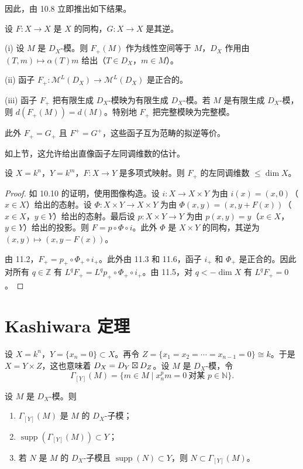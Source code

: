 因此，由 10.8 立即推出如下结果。

\begin{lemma}
设 $F:X\to X$ 是 $X$ 的同构，$G:X\to X$ 是其逆。

(i) 设 $M$ 是 $D_X$-模。则 $F_+(M)$ 作为线性空间等于 $M$，$D_X$ 作用由 $(T,m)\longmapsto\alpha(T)m$ 给出（$T\in D_X$，$m\in M$）。

(ii) 函子 $F_+:\mathcal{M}^L(D_X)\to\mathcal{M}^L(D_X)$ 是正合的。

(iii) 函子 $F_+$ 把有限生成 $D_X$-模映为有限生成 $D_X$-模。若 $M$ 是有限生成 $D_X$-模，则 $d(F_+(M))=d(M)$。特别地 $F_+$ 把完整模映为完整模。
\end{lemma}

此外 $F_+=G_+$ 且 $F^+=G^+$，这些函子互为范畴的拟逆等价。

如上节，这允许给出直像函子左同调维数的估计。

\begin{theorem}
设 $X=k^n$，$Y=k^m$，$F:X\to Y$ 是多项式映射。则 $F_+$ 的左同调维数 $\le\dim X$。
\end{theorem}

\begin{proof}
如 10.10 的证明，使用图像构造。设 $i:X\to X\times Y$ 为由 $i(x)=(x,0)$（$x\in X$）给出的态射。设 $\Phi:X\times Y\to X\times Y$ 为由 $\Phi(x,y)=(x,y+F(x))$（$x\in X$，$y\in Y$）给出的态射。最后设 $p:X\times Y\to Y$ 为由 $p(x,y)=y$（$x\in X$，$y\in Y$）给出的投影。则 $F=p\circ\Phi\circ i$。此外 $\Phi$ 是 $X\times Y$ 的同构，其逆为 $(x,y)\longmapsto(x,y-F(x))$。

由 11.2，$F_+=p_+\circ\Phi_+\circ i_+$。此外由 11.3 和 11.6，函子 $i_+$ 和 $\Phi_+$ 是正合的。因此对所有 $q\in\mathbb{Z}$ 有 $L^qF_+=L^qp_+\circ\Phi_+\circ i_+$。由 11.5，对 $q<-\dim X$ 有 $L^qF_+=0$。
\end{proof}

\section{Kashiwara 定理}

设 $X=k^n$，$Y=\{x_n=0\}\subset X$。再令 $Z=\{x_1=x_2=\cdots=x_{n-1}=0\}\cong k$。于是 $X=Y\times Z$，这也意味着 $D_X=D_Y\mathbin{\boxtimes} D_Z$。设 $M$ 是 $D_X$-模，令
$$\Gamma_{[Y]}(M)=\{m\in M\mid x_n^p m=0\ \text{对某 }p\in\mathbb{N}\}.$$

\begin{lemma}
设 $M$ 是 $D_X$-模。则
\begin{enumerate}[label=(\roman*)]
  \item $\Gamma_{[Y]}(M)$ 是 $M$ 的 $D_X$-子模；
  \item $\operatorname{supp}(\Gamma_{[Y]}(M))\subset Y$；
  \item 若 $N$ 是 $M$ 的 $D_X$-子模且 $\operatorname{supp}(N)\subset Y$，则 $N\subset\Gamma_{[Y]}(M)$。
\end{enumerate}
\end{lemma}

